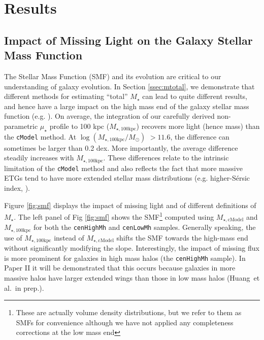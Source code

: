 \documentclass[a4paper,fleqn,usenatbib]{mnras}
\def\etal{{\ et al.~}}
\def\ser{{S\'{e}rsic\ }}
\def\rbcg{\texttt{cenHighMh}}
\def\nbcg{\texttt{cenLowMh}}
\def\mstar{{$M_{\star}$}}
\def\mtot{{$M_{\star,100\mathrm{kpc}}$}}
\def\mcmodel{{$M_{\star,\mathrm{cModel}}$}}
\def\logmtot{{$\log (M_{\star,100\mathrm{kpc}}/M_{\odot})$}}
\def\mden{{$\mu_{\star}$}}
\begin{document}
\section{Results}
    \label{sec:result}

\subsection{Impact of Missing Light on the Galaxy Stellar Mass Function}
    \label{ssec:smf}
    
    The Stellar Mass Function (SMF) and its evolution are critical to our understanding of galaxy evolution. In Section \ref{ssec:mtotal}, we demonstrate that different methods for estimating
    ``total'' \mstar{} can lead to quite different results, and hence have a large impact 
    on the high mass end of the galaxy stellar mass function (e.g. 
    \citealt{Bernardi2013, DSouza2014, DSouza2015, Bernardi2017}).
    On average, the integration of our carefully derived non-parametric \mden{} profile 
    to 100 kpc (\mtot{}) recovers more light (hence mass) than the \texttt{cModel}
    method. 
    At \logmtot{} $>11.6$, the difference can sometimes be larger than 0.2 dex. 
    More importantly, the average difference steadily increases with \mtot{}. 
    These differences relate to the intrinsic limitation of the \texttt{cModel} 
    method and also reflects the fact that more massive ETGs tend to have more 
    extended stellar mass distributions (e.g. higher-\ser{} index, 
    \citealt{Graham2003}).
    
     Figure \ref{fig:smf} displays the impact of missing light and of different definitions of \mstar{}. The left panel of Fig \ref{fig:smf} shows the SMF\footnote{These are actually volume density distributions, but we refer to them as SMFs for convenience although we have not applied any completeness corrections at the low mass end} computed using \mcmodel{} and \mtot{} for both the \rbcg{} and \nbcg{} samples. Generally speaking, the use of \mtot{} instead of \mcmodel{} shifts the SMF 
    towards the high-mass end without significantly modifying the slope.
    Interestingly, the impact of missing flux is more prominent for  galaxies in high mass halos (the \rbcg{} sample). In Paper II it will be demonstrated that this occurs because  galaxies in more massive halos have larger extended  wings than those  in low mass halos (Huang\etal in prep.).
\end{document}
